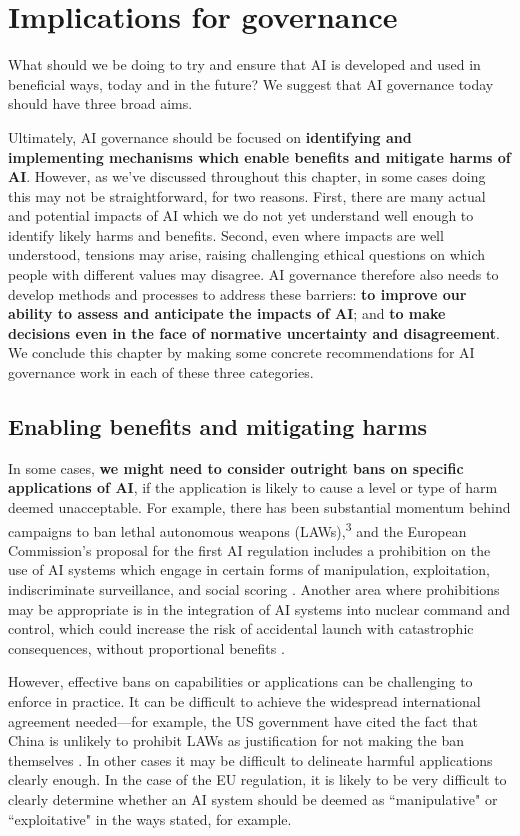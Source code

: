 \documentclass{article}
\begin{document}
\section{Implications for governance}

What should we be doing to try and ensure that AI is developed and used in beneficial ways, today and in the future? We suggest that AI governance today should have three broad aims.


Ultimately, AI governance should be focused on \textbf{identifying and implementing mechanisms which enable benefits and mitigate harms of AI}. However, as we’ve discussed throughout this chapter, in some cases doing this may not be straightforward, for two reasons. First, there are many actual and potential impacts of AI which we do not yet understand well enough to identify likely harms and benefits. Second, even where impacts are well understood, tensions may arise, raising challenging ethical questions on which people with different values may disagree. AI governance therefore also needs to develop methods and processes to address these barriers: \textbf{to improve our ability to assess and anticipate the impacts of AI}; and \textbf{to make decisions even in the face of normative uncertainty and disagreement}. We conclude this chapter by making some concrete recommendations for AI governance work in each of these three categories.


\subsection{Enabling benefits and mitigating harms}

In some cases, \textbf{we might need to consider outright bans on specific applications of AI}, if the application is likely to cause a level or type of harm deemed unacceptable. For example, there has been substantial momentum behind campaigns to ban lethal autonomous weapons (LAWs),\textsuperscript{3} and the European Commission’s proposal for the first AI regulation includes a prohibition on the use of AI systems which engage in certain forms of manipulation, exploitation, indiscriminate surveillance, and social scoring \citep{noauthor_proposal_2021}. Another area where prohibitions may be appropriate is in the integration of AI systems into nuclear command and control, which could increase the risk of accidental launch with catastrophic consequences, without proportional benefits \citep{ord_future_2021}.


However, effective bans on capabilities or applications can be challenging to enforce in practice. It can be difficult to achieve the widespread international agreement needed---for example, the US government have cited the fact that China is unlikely to prohibit LAWs as justification for not making the ban themselves \citep{nscai_2021_2021}. In other cases it may be difficult to delineate harmful applications clearly enough. In the case of the EU regulation, it is likely to be very difficult to clearly determine whether an AI system should be deemed as ``manipulative" or ``exploitative" in the ways stated, for example.
\end{document}
